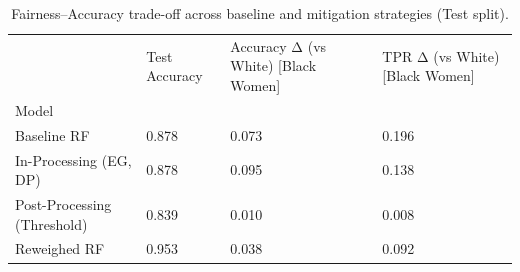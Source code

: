 \begin{table}[htbp]
\centering
\caption{Fairness–Accuracy trade-off across baseline and mitigation strategies (Test split).}
\label{tab:mitigation-effectiveness}
\begin{tabular}{llll}
\toprule
 & Test Accuracy & Accuracy Δ (vs White) [Black Women] & TPR Δ (vs White) [Black Women] \\
Model &  &  &  \\
\midrule
Baseline RF & 0.878 & 0.073 & 0.196 \\
In-Processing (EG, DP) & 0.878 & 0.095 & 0.138 \\
Post-Processing (Threshold) & 0.839 & 0.010 & 0.008 \\
Reweighed RF & 0.953 & 0.038 & 0.092 \\
\bottomrule
\end{tabular}

\end{table}
